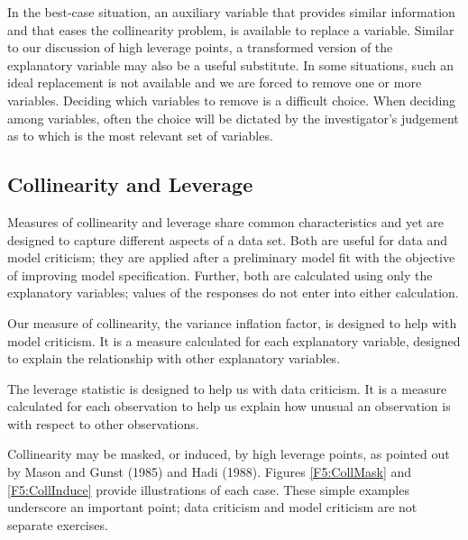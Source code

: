 
In the best-case situation, an auxiliary variable that provides
similar information and that eases the collinearity problem, is
available to replace a variable. Similar to our discussion of high
leverage points, a transformed version of the explanatory variable
may also be a useful substitute. In some situations, such an ideal
replacement is not available and we are forced to remove one or more
variables. Deciding which variables to remove is a difficult choice.
When deciding among variables, often the choice will be dictated by
the investigator's judgement as to which is the most relevant set of
variables.

\subsection{Collinearity and
Leverage}

Measures of collinearity and leverage share common characteristics
and yet are designed to capture different aspects of a data set.
Both are useful for data and model criticism; they are applied after
a preliminary model fit with the objective of improving model
specification. Further, both are calculated using only the
explanatory variables; values of the responses do not enter into
either calculation.

Our measure of collinearity, the variance inflation factor, is
designed to help with model criticism. It is a measure calculated
for each explanatory variable, designed to explain the relationship
with other explanatory variables.

The leverage statistic is designed to help us with data criticism. It is a
measure calculated for each observation to help us explain how unusual an
observation is with respect to other observations.

Collinearity may be masked, or induced, by high leverage points, as
pointed out by Mason and Gunst (1985) and Hadi (1988). Figures
\ref{F5:CollMask} and \ref{F5:CollInduce} provide illustrations of
each case. These simple examples underscore an important point; data
criticism and model criticism are not separate exercises.


